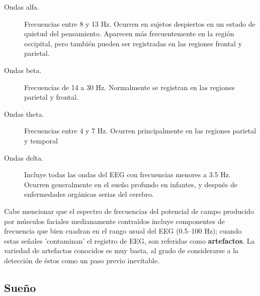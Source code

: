\begin{description}
\item[Ondas alfa.] Frecuencias entre 8 y 13 Hz. Ocurren en sujetos despiertos en un estado de 
quietud del pensamiento. 
Aparecen m\'as frecuentemente en la regi\'on occipital, pero tambi\'en 
pueden ser registradas en las regiones frontal y parietal. 

\item[Ondas beta.] Frecuencias de 14 a 30 Hz. Normalmente se registran en las regiones parietal y 
frontal. 

\item[Ondas theta.] Frecuencias entre 4 y 7 Hz. Ocurren principalmente en las regiones parietal y 
temporal 

\item[Ondas delta.] Incluye todas las ondas del EEG con frecuencias menores a 3.5 Hz. Ocurren 
generalmente en el sue\~no profundo en infantes, y despu\'es de enfermedades org\'anicas serias del 
cerebro.
\end{description}

Cabe mencionar que el espectro de frecuencias del potencial de campo producido por m\'usculos 
faciales medianamente contra\'idos incluye componentes de frecuencia que bien cuadran en el rango 
usual del EEG (0.5--100 Hz); cuando estas se\~nales 'contaminan' el registro de EEG, son referidas
como \textbf{artefactos}. La variedad de artefactos conocidos es muy basta, al grado de
considerarse a la detecci\'on de \'estos como un paso previo inevitable.


\subsection{Sue\~no}

